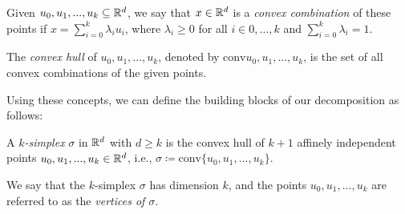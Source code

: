 \documentclass[../main.tex]{subfiles}
\begin{document}
\begin{definition}
\begin{sloppypar}
Given ${u_0, u_1, ..., u_k} \subseteq \mathbb{R}^d$, we say that $x \in \mathbb{R}^d$ is a \emph{convex combination} of these points if $x = \sum_{i=0}^{k} \lambda_i u_i$, where $\lambda_i \geq 0$ for all $i \in {0,...,k}$ and $\sum_{i=0}^{k} \lambda_i = 1$.
\end{sloppypar}
\end{definition}

\begin{definition}
\begin{sloppypar}
The \emph{convex hull} of $u_0, u_1, ..., u_k$, denoted by ${\text{conv}{u_0, u_1, ..., u_k}}$, is the set of all convex combinations of the given points.
\end{sloppypar}
\end{definition}

Using these concepts, we can define the building blocks of our decomposition as follows:

\begin{definition}
A \emph{$k$-simplex} $\sigma$ in $\mathbb{R}^d$ with $d \geq k$ is the convex hull of $k+1$ affinely independent points $u_0, u_1, ..., u_k \in \mathbb{R}^d$, i.e.,
$\sigma \coloneqq \text{conv}\{u_0, u_1, ..., u_k\}$.
\end{definition}

We say that the $k$-simplex $\sigma$ has dimension $k$, and the points $u_0, u_1, ..., u_k$ are referred to as the \emph{vertices of $\sigma$}.
\end{document}
